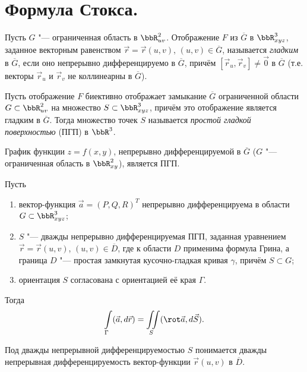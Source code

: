 \chapter{Формула Стокса.}

\begin{defn}
Пусть $G$ "--- ограниченная область в $\bbR^2_{uv}$. Отображение $F$ из $\overline{G}$ в $\bbR^3_{xyz}$, заданное векторным равенством $\vec{r} = \vec{r}(u, v)$, $(u, v) \in \overline{G}$, называется \textit{гладким} в $\overline{G}$, если оно непрерывно дифференцируемо в $\overline{G}$, причём $[\vec{r}_u, \vec{r}_v] \neq \vec{0}$ в $\overline{G}$ (т.е. векторы $\vec{r}_u$ и $\vec{r}_v$ не коллинеарны в $\overline{G}$).
\end{defn}

\begin{defn}
Пусть отображение $F$ биективно отображает замыкание $\overline{G}$ ограниченной области $G \subset \bbR^2_{uv}$ на множество $S \subset \bbR^3_{xyz}$, причём это отображение является гладким в $\overline{G}$. Тогда множество точек $S$ называется \textit{простой гладкой поверхностью} (ПГП) в $\bbR^3$.
\end{defn}

\begin{exmpl}
График функции $z = f(x, y)$, непрерывно дифференцируемой в $\overline{G}$ ($G$ "--- ограниченная область в $\bbR^2_{xy}$), является ПГП.
\end{exmpl}

\begin{thm} \label{th21:3}
Пусть
\begin{enumerate}
\item[$1^\circ$.] вектор-функция $\vec{a} = (P, Q, R)^T$ непрерывно дифференцируема в области $G \subset \bbR^3_{xyz}$;
\item[$2^\circ$.] $S$ "--- дважды непрерывно дифференцируемая ПГП, заданная уравнением $\vec{r} = \vec{r}(u, v)$, $(u, v) \in \overline{D}$, где к области $D$ применима формула Грина, а граница $D$ "--- простая замкнутая кусочно-гладкая кривая $\gamma$, причём $S \subset G$;
\item[$3^\circ$.] ориентация $S$ согласована с ориентацией её края $\Gamma$.
\end{enumerate}
Тогда
$$
\int\limits_\Gamma (\vec{a}, d\vec{r}) = \iint\limits_S (\rot \vec{a}, d\vec{S}).
$$
\end{thm}

\begin{notion}
Под дважды непрерывной дифференцируемостью $S$ понимается дважды непрерывная дифференцируемость вектор-функции $\vec{r}(u, v)$ в $\overline{D}$.
\end{notion}


